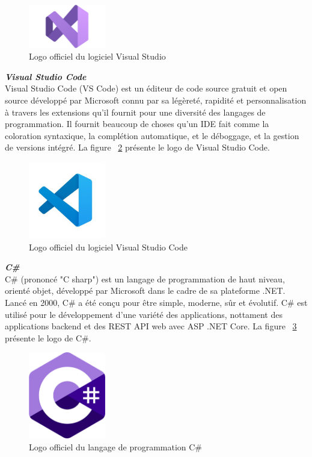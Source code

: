\begin{figure}[H]
\centering
\includegraphics[width=0.3\textwidth]{logos/vs.png}
\caption{Logo officiel du logiciel Visual Studio}
\label{fig:vs}
\end{figure}

\noindent
{\small\textbf{\textit{Visual Studio Code}}}\mbox{}\\
Visual Studio Code (VS Code) est un éditeur de code source gratuit et open source développé par Microsoft connu par sa légèreté, rapidité et personnalisation à travers les extensions qu'il fournit pour une diversité des langages de programmation.
Il fournit beaucoup de choses qu'un IDE fait comme la coloration syntaxique, la complétion automatique, et le déboggage, et la gestion de versions intégré. La figure ~\ref{fig:vsc} présente le logo de Visual Studio Code.
\begin{figure}[H]
\centering
\includegraphics[width=0.3\textwidth]{logos/vsc.png}
\caption{Logo officiel du logiciel Visual Studio Code}
\label{fig:vsc}
\end{figure}

\noindent
{\small\textbf{\textit{C\#}}}\mbox{}\\
C\# (prononcé "C sharp") est un langage de programmation de haut niveau, orienté objet, développé par Microsoft dans le cadre de sa plateforme .NET. Lancé en 2000, C\# a été conçu pour être simple, moderne, sûr et évolutif. C\# est utilisé pour le développement  d'une variété des applications, nottament des applications backend et des REST API web avec ASP .NET Core. La figure ~\ref{fig:cs} présente le logo de C\#.
\begin{figure}[H]
\centering
\includegraphics[width=0.3\textwidth]{logos/csharp.png}
\caption{Logo officiel du langage de programmation C\#}
\label{fig:cs}
\end{figure}

